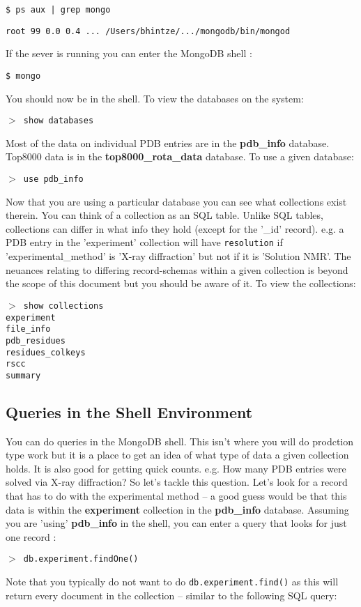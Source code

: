 \documentclass[12pt]{article}
\newcommand{\cmdline}[1]{\vspace{5mm} \noindent
\texttt{\$ #1}
\vspace{5mm}

}
\newcommand{\mdbcmdline}[1]{\vspace{5mm} \noindent
\texttt{$>$ #1}
\vspace{5mm}

}
\newcommand{\mdbdb}[1]{{\color{BlueViolet}\textbf{#1}}}
\newcommand{\mdbcol}[1]{{\color{Bittersweet}\textbf{#1}}}
\begin{document}
\cmdline{ps aux | grep mongo}
\noindent
\texttt{root 99 0.0 0.4 ... /Users/bhintze/.../mongodb/bin/mongod}

\vspace{5mm}
\noindent
If the sever is running you can enter the MongoDB shell :

\cmdline{mongo}
\noindent
You should now be in the shell.
To view the databases on the system:

\mdbcmdline{show databases}
\noindent
Most of the data on individual PDB entries are in the \mdbdb{pdb\_info} database.
Top8000 data is in the \mdbdb{top8000\_rota\_data} database.
\noindent
To use a given database:

\mdbcmdline{use pdb\_info}
\noindent
Now that you are using a particular database you can see what collections exist therein. 
You can think of a collection as an SQL table.
Unlike SQL tables, collections can differ in what info they hold (except for the '\_id' record).
e.g. a PDB entry in the 'experiment' collection will have \texttt{resolution} if 'experimental\_method' is 'X-ray diffraction' but not if it is 'Solution NMR'.
The neuances relating to differing record-schemas within a given collection is beyond the scope of this document but you should be aware of it. To view the collections:

\mdbcmdline{show collections\\
experiment\\
file\_info\\
pdb\_residues\\
residues\_colkeys\\
rscc\\
summary}

\subsection{Queries in the Shell Environment}
You can do queries in the MongoDB shell. 
This isn't where you will do prodction type work but it is a place to get an idea of what type of data a given collection holds.
It is also good for getting quick counts.
e.g. How many PDB entries were solved via X-ray diffraction?
So let's tackle this question.
Let's look for a record that has to do with the experimental method -- a good guess would be that this data is within the \mdbcol{experiment} collection in the \mdbdb{pdb\_info} database.
Assuming you are 'using' \mdbdb{pdb\_info} in the shell, you can enter a query that looks for just one record :

\mdbcmdline{db.experiment.findOne()}
\noindent
Note that you typically do not want to do \texttt{db.experiment.find()} as this will return every document in the collection -- similar to the following SQL query:
\end{document}
